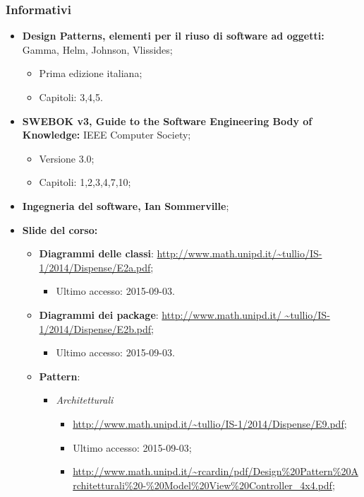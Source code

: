   \subsubsection{Informativi}
      \begin{itemize}
		\item \textbf{Design Patterns, elementi per il riuso di software ad oggetti: } Gamma,  Helm,  Johnson,  Vlissides;
		\begin{itemize}
			\item Prima edizione italiana;
			\item Capitoli: 3,4,5.						
		\end{itemize}
		\item \textbf{SWEBOK v3, Guide to the Software Engineering Body of Knowledge: } IEEE Computer Society;
		\begin{itemize}
			\item Versione 3.0;
			\item Capitoli: 1,2,3,4,7,10;
		\end{itemize}
		\item \textbf{Ingegneria del software, Ian Sommerville};
		\item \textbf{\gls{Slide} del corso: }
				\begin{itemize}
					\item \textbf{Diagrammi delle classi}: \url{http://www.math.unipd.it/~tullio/IS-1/2014/Dispense/E2a.pdf};
					\begin{itemize}
						\item Ultimo accesso: 2015-09-03.
					\end{itemize}
					\item \textbf{Diagrammi dei package}: \url{http://www.math.unipd.it/ ~tullio/IS-1/2014/Dispense/E2b.pdf};
					\begin{itemize}
						\item Ultimo accesso: 2015-09-03.
					\end{itemize}
					\item \textbf{Pattern}:
					\begin{itemize}
						\item \textit{Architetturali}
							\begin{itemize}
								\item \url{http://www.math.unipd.it/~tullio/IS-1/2014/Dispense/E9.pdf}; 
								\item Ultimo accesso: 2015-09-03;
								\item \url{http://www.math.unipd.it/~rcardin/pdf/Design\%20Pattern\%20Architetturali\%20-\%20Model\%20View\%20Controller\_4x4.pdf};

\end{itemize}
\end{itemize}
\end{itemize}
\end{itemize}
